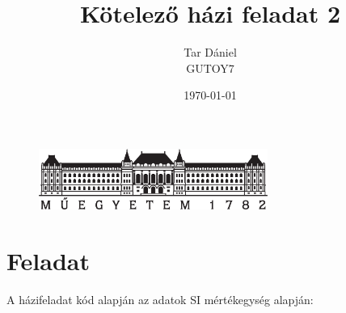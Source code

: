 \documentclass{article}
\begin{document}
	
	\begin{titlepage}
		\setlength{\headheight}{20pt}
		\title{\huge Kötelező házi feladat 2
		}
		\author{Tar Dániel\\GUTOY7}
		\date{\today}
		\maketitle
		\thispagestyle{fancy}
		
		\begin{figure}
			\begin{center}
				\includegraphics[height=2cm]{logo_bme_kicsi.eps}
			\end{center}
		\end{figure}
		
	\end{titlepage}
	\newpage

	 
	\newpage
	
	
	\setlength{\headheight}{0pt}
	\tableofcontents
	\newpage
	
	\setcounter{page}{1}

	
	
	

	
	
	\section{Feladat}
	
	A házifeladat kód alapján az adatok SI mértékegység alapján:
	
\end{document}
